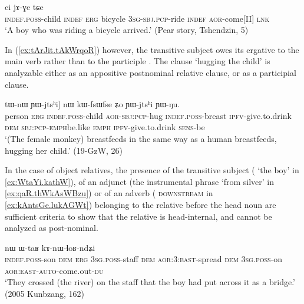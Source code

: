 \begin{exe}
\ex  \label{ex:WkWnWmbrApW}
 ci jɤ-ɣe tɕe \\
 \textsc{indef}.\textsc{poss}-child \textsc{indef} \textsc{erg} bicycle \textsc{3sg}-\textsc{sbj}.\textsc{pcp}-ride \textsc{indef} \textsc{aor}-come[II] \textsc{lnk} \\
\glt `A boy who was riding a bicycle arrived.' (Pear story, Tshendzin, 5)
\end{exe}

In (\ref{ex:tArJit.tAkWrqoR}) however, the transitive subject  owes its ergative to the main verb  rather than to the participle . The clause  `hugging the child' is analyzable either as an appositive postnominal relative clause, or as a participial clause.


\begin{exe}
\ex  \label{ex:tArJit.tAkWrqoR}
\gll  [tɯrme kɯ [tɤ-rɟit tɤ-kɯ-rqoʁ] tɯ-nɯ ɲɯ-jtsʰi] nɯ kɯ-fsɯ\redp{}fse ʑo ɲɯ-jtsʰi ɲɯ-ŋu.\\
person \textsc{erg} \textsc{indef}.\textsc{poss}-child \textsc{aor}-\textsc{sbj}:\textsc{pcp}-hug \textsc{indef}.\textsc{poss}-breast \textsc{ipfv}-give.to.drink \textsc{dem} \textsc{sbj}:\textsc{pcp}-\textsc{emph}\redp{}be.like \textsc{emph} \textsc{ipfv}-give.to.drink \textsc{sens}-be \\
\glt `(The female monkey) breastfeeds in the same way as a human breastfeeds, hugging her child.' (19-GzW, 26)
\end{exe}

In the case of object relatives,  the presence of the transitive subject ( `the boy' in \ref{ex:WtaYi.kathW}), of an adjunct (the instrumental phrase  `from silver' in \ref{ex:qaR.thWkAsWBzu}) or of an adverb ( \textsc{downstream} in \ref{ex:kAntsGe.lukAGWt}) belonging to the relative before the head noun are sufficient criteria to show that the relative is head-internal, and cannot be analyzed as post-nominal.
 
\begin{exe}
\ex \label{ex:WtaYi.kathW}
 nɯ ɯ-taʁ kɤ-nɯ-ɬoʁ-ndʑi   \\
\textsc{indef}.\textsc{poss}-son \textsc{dem} \textsc{erg} \textsc{3sg}.\textsc{poss}-staff \textsc{dem} \textsc{aor}:3\flobv{}:\textsc{east}-spread \textsc{dem} \textsc{3sg}.\textsc{poss}-on \textsc{aor}:\textsc{east}-\textsc{auto}-come.out-\textsc{du} \\
\glt `They crossed (the river) on the staff that the boy had put across it as a bridge.' (2005 Kunbzang, 162)
 \end{exe}  
 
